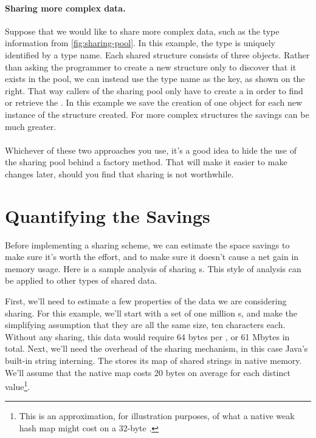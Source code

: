 \paragraph{Sharing more complex data.} Suppose that we would like to
share more complex data, such as the type information from \autoref{fig:sharing-pool}. In this example, the type is
uniquely identified by a  type name. Each shared structure
consists of three objects. Rather than asking the programmer to create a new  structure only to discover
that it exists in the pool, we can instead use the type name as the key, as
shown on the right. That way callers of the sharing pool only have to create a
 in order to find or retrieve the . In this example we save the creation of
one object for each new instance of the structure created.  For more complex
structures the savings can be much greater.

\paragraph{} Whichever of these two approaches you use, it's a good idea to hide
the use of the sharing pool behind a factory method. That will make it easier to make
changes later, should you find that sharing is not worthwhile.



\section{Quantifying the Savings}
\label{sec:quantifying-sharing-savings}

Before implementing a sharing scheme, we can estimate the
space savings to make sure it's worth
the effort, and to make sure it doesn't cause a net gain in
memory usage. Here is a sample analysis of sharing s.
This style of analysis can be applied to other types of shared data.

First, we'll need to estimate
a few properties of the data we are considering sharing. For this example,
we'll start with a set of one million s, and make the
simplifying assumption that they are all the same size, ten characters each.
Without any sharing, this data would require 64 bytes per ,
or 61 Mbytes in total. Next, we'll need the overhead
of the sharing mechanism, in this case Java's built-in string interning. The
\jre stores its map of shared strings in native memory. We'll assume that the
native map costs 20 bytes on average for each distinct value\footnote{This is
an approximation, for illustration purposes, of what
a native weak hash map might cost on a 32-byte \jre.}. 

